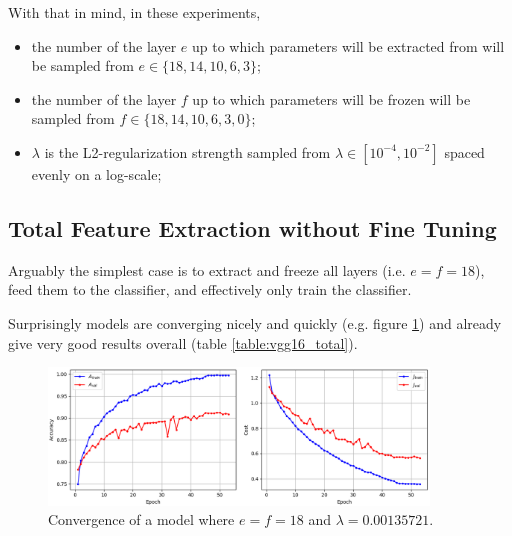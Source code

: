 With that in mind, in these experiments,

\begin{itemize}
    \item the number of the layer $e$ up to which parameters will be extracted from will be sampled from $e \in \{18,14,10,6,3\}$;
    \item the number of the layer $f$ up to which parameters will be frozen will be sampled from $f \in \{18,14,10,6,3,0\}$;
    \item $\lambda$ is the L2-regularization strength sampled from $\lambda \in [10^{-4}, 10^{-2}]$ spaced evenly on a log-scale;
\end{itemize}

\subsection{Total Feature Extraction without Fine Tuning}

Arguably the simplest case is to extract and freeze all layers (i.e. $e = f = 18$), feed them to the classifier, and effectively only train the classifier.

Surprisingly models are converging nicely and quickly (e.g. figure \ref{fig:vgg16_total_convergence}) and already give very good results overall (table \ref{table:vgg16_total}).

\begin{figure}[ht]
    \centering
    \includegraphics[width=0.9\textwidth]{figs/vgg16_total_convergence.png}
    \caption{Convergence of a model where $e = f = 18$ and $\lambda = 0.00135721$.}
    \label{fig:vgg16_total_convergence}
\end{figure}

